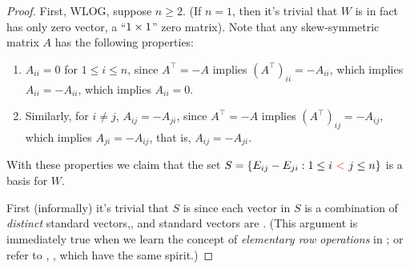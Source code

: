 \begin{proof}
First, WLOG, suppose \(n \ge 2\).
(If \(n = 1\), then it's trivial that \(W\) is in fact has only zero vector, a ``\(1 \times 1\)'' zero matrix).
Note that any skew-symmetric matrix \(A\) has the following properties:
\begin{enumerate}
    \item \(A_{ii} = 0\) for \(1 \le i \le n\), since \(A^\top = -A\) implies \((A^\top)_{ii} = -A_{ii}\), which implies \(A_{ii} = -A_{ii}\), which implies \(A_{ii} = 0\).
    \item Similarly, for \(i \ne j\), \(A_{ij} = -A_{ji}\), since \(A^\top = -A\) implies \((A^\top)_{ij} = -A_{ij}\), which implies \(A_{ji} = -A_{ij}\), that is, \(A_{ij} = -A_{ji}\).
\end{enumerate}
With these properties we claim that the set \(S = \{ E_{ij} - E_{ji} : 1 \le i\ \RED{<}\ j \le n \}\) is a basis for \(W\).

First (informally) it's trivial that \(S\) is \LID{} since each vector in \(S\) is a combination of \emph{distinct} standard vectors,, and standard vectors are \LID{}.
(This argument is immediately true when we learn the concept of \emph{elementary row operations} in ; or refer to , , which have the same spirit.)


\end{proof}
